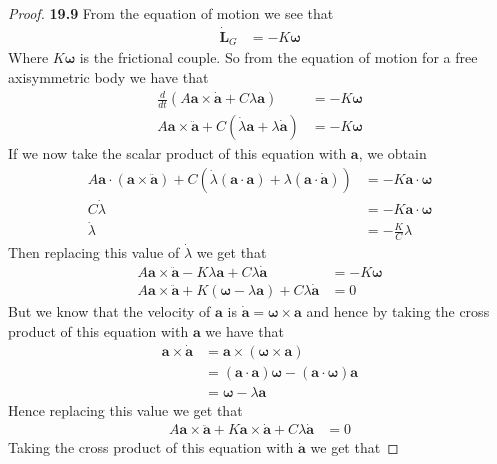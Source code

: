 \documentclass[11pt]{article}
\theoremstyle{definition}
\begin{document}
\cleardoublepage
\begin{proof}{\textbf{19.9}}
    From the equation of motion we see that
    \begin{align*}
        \bm{\dot{L}}_G &= -K\bm{\omega} 
    \end{align*}
    Where $K\bm{\omega}$ is the frictional couple.
    So from the equation of motion for a free axisymmetric body we have that
    \begin{align*}
        \frac{d}{dt}(A\bm{a}\times\bm{\dot a} + C\lambda\bm{a})
        &= -K\bm{\omega}\\
        A\bm{a}\times\bm{\ddot a} + C(\dot\lambda\bm{a} + \lambda\bm{\dot a})
        &= -K\bm{\omega}
    \end{align*}
    If we now take the scalar product of this equation with $\bm{a}$, we obtain
    \begin{align*}
        A\bm{a}\cdot(\bm{a}\times\bm{\ddot a})
        + C(\dot\lambda(\bm{a}\cdot \bm{a})
        + \lambda(\bm{a} \cdot \bm{\dot a}))
        &= -K\bm{a}\cdot \bm{\omega}\\
        C\dot\lambda &= -K\bm{a}\cdot \bm{\omega}\\
        \dot\lambda &= -\frac{K}{C}\lambda
    \end{align*}
    Then replacing this value of $\dot\lambda$ we get that 
    \begin{align*}
        A\bm{a}\times\bm{\ddot a} - K\lambda\bm{a} + C\lambda\bm{\dot a}
        &= -K\bm{\omega}\\
        A\bm{a}\times\bm{\ddot a}
        + K(\bm{\omega} - \lambda\bm{a})
        + C\lambda\bm{\dot a}
        &= 0
    \end{align*}
    But we know that the velocity of $\bm{a}$ is
    $\bm{\dot a} = \bm{\omega} \times \bm{a}$ and hence by taking the cross
    product of this equation with $\bm{a}$ we have that
    \begin{align*}
        \bm{a} \times \bm{\dot a} &= \bm{a} \times(\bm{\omega} \times \bm{a})\\
        &= (\bm{a} \cdot \bm{a})\bm{\omega} - (\bm{a}\cdot\bm{\omega})\bm{a}\\
        &= \bm{\omega} - \lambda \bm{a}
    \end{align*}
    Hence replacing this value we get that
    \begin{align*}
        A\bm{a}\times\bm{\ddot a}
        + K\bm{a}\times\bm{\dot a}
        + C\lambda\bm{\dot a}
        &= 0
    \end{align*}
    Taking the cross product of this equation with $\bm{\dot a}$ we get that

\end{proof}
\end{document}
